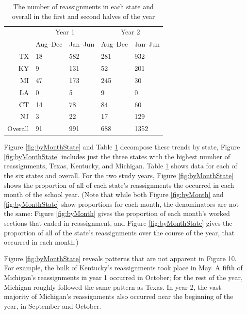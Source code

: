 \documentclass[notitlepage,12pt]{jedm}\usepackage[]{graphicx}\usepackage[]{color}
\begin{document}
\begin{table}
  \centering
  \begin{tabular}{rll|ll}
    &\multicolumn{2}{c}{Year 1}&\multicolumn{2}{c}{Year 2}\\
    &Aug--Dec&Jan--Jun&Aug--Dec&Jan--Jun\\
 TX &  18 & 582 & 281 & 932 \\ 
  KY &   9 & 131 &  52 & 201 \\ 
  MI &  47 & 173 & 245 &  30 \\ 
  LA &   0 &   5 &   9 &   0 \\ 
  CT &  14 &  78 &  84 &  60 \\ 
  NJ &   3 &  22 &  17 & 129 \\ 
   \hline
Overall &  91 & 991 & 688 & 1352 \\ 
  
\hline
\end{tabular}
\caption{The number of reassignments in each state and overall in the
  first and second halves of the year}
\label{tab:byMonth}
\end{table}

Figure \ref{fig:byMonthState} and Table \ref{tab:byMonth} decompose
these trends by state, Figure \ref{fig:byMonthState} includes just
the three states with the highest number of reassignments, Texas,
Kentucky, and Michigan. Table \ref{tab:byMonth} shows data for each of
the six states and overall.
For the two study years, Figure \ref{fig:byMonthState} shows the proportion of all of each
state's reassignments the occurred in each month of the school year.
(Note that while both Figure \ref{fig:byMonth} and \ref{fig:byMonthState}
show proportions for each month, the denominators are not the same:
Figure \ref{fig:byMonth} gives the proportion of each month's worked
sections that ended in reassignment, and Figure \ref{fig:byMonthState}
gives the proportion of all of the state's reassignments over the
course of the year, that occurred in each month.)

Figure \ref{fig:byMonthState} reveals patterns that are not apparent
in Figure 10.
For example, the bulk of Kentucky's reassignments took place in May.
A fifth of Michigan's reassignments in year 1 occurred in October;
for the rest of the year, Michigan roughly followed the same pattern as Texas.
In year 2, the vast majority of Michigan's reassignments also occurred near
the beginning of the year, in September and October.
\end{document}
